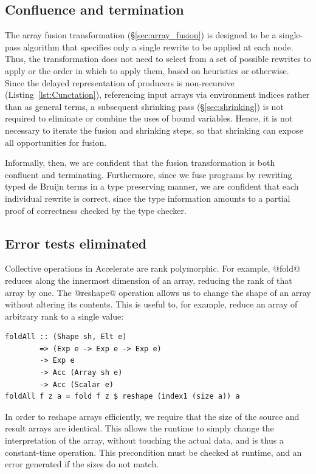 \subsection{Confluence and termination}

The array fusion transformation (\S\ref{sec:array_fusion}) is
designed to be a single-pass algorithm that specifies only a single rewrite to
be applied at each node. Thus, the transformation does not need to select from a
set of possible rewrites to apply or the order in which to apply them, based on
heuristics or otherwise. Since the delayed representation of producers is
non-recursive (Listing~\ref{lst:Cunctation}), referencing input arrays via
environment indices rather than as general terms, a subsequent shrinking pass
(\S\ref{sec:shrinking}) is not required to eliminate or combine the uses of
bound variables. Hence, it is not necessary to iterate the fusion and shrinking
steps, so that shrinking can expose all opportunities for fusion.

Informally, then, we are confident that the fusion transformation is both
confluent and terminating. Furthermore, since we fuse programs by rewriting
typed de Bruijn terms in a type preserving manner, we are confident that each
individual rewrite is correct, since the type information amounts to a partial
proof of correctness checked by the type checker.


\subsection{Error tests eliminated}

Collective operations in Accelerate are rank polymorphic. For example, @fold@
reduces along the innermost dimension of an array, reducing the rank of that
array by one. The @reshape@ operation allows us to change the shape of an array
without altering its contents. This is useful to, for example, reduce an array
of arbitrary rank to a single value:
%
\begin{lstlisting}[style=haskell]
foldAll :: (Shape sh, Elt e)
        => (Exp e -> Exp e -> Exp e)
        -> Exp e
        -> Acc (Array sh e)
        -> Acc (Scalar e)
foldAll f z a = fold f z $ reshape (index1 (size a)) a
\end{lstlisting}
%
In order to reshape arrays efficiently, we require that the size of the source
and result arrays are identical. This allows the runtime to simply change the
interpretation of the array, without touching the actual data, and is thus a
constant-time operation. This precondition must be checked at runtime, and an
error generated if the sizes do not match.

